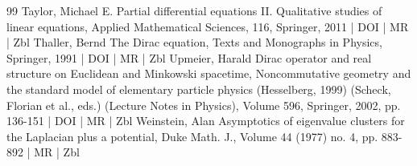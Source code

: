\begin{thebibliography}{99}
Taylor, Michael E. Partial differential equations II. Qualitative studies of linear equations, Applied Mathematical Sciences, 116, Springer, 2011 | DOI | MR | Zbl
Thaller, Bernd The Dirac equation, Texts and Monographs in Physics, Springer, 1991 | DOI | MR | Zbl
Upmeier, Harald Dirac operator and real structure on Euclidean and Minkowski spacetime, Noncommutative geometry and the standard model of elementary particle physics (Hesselberg, 1999) (Scheck, Florian et al., eds.) (Lecture Notes in Physics), Volume 596, Springer, 2002, pp. 136-151 | DOI | MR | Zbl
Weinstein, Alan Asymptotics of eigenvalue clusters for the Laplacian plus a potential, Duke Math. J., Volume 44 (1977) no. 4, pp. 883-892 | MR | Zbl
\end{thebibliography}
